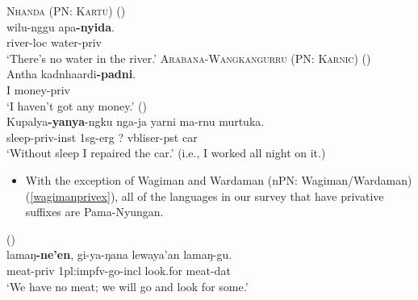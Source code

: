 \documentclass{article}
\begin{document}


\begin{exe}
  \ex \textsc{Nhanda (PN: Kartu)} (\citealt[64]{blevins01}) \label{privexist1}\\
  \gll wilu-nggu apa\textbf{-nyida}.\\
  river-{\sc loc} water-{\sc priv}\\
  \glt `There's no water in the river.'
  \ex \textsc{Arabana-Wangkangurru (PN: Karnic)} (\citealt[237]{hercus94})\\
  \gll Antha kadnhaardi\textbf{-padni}.\\
  I money-{\sc priv}\\
  \glt `I haven't got any money.'
   (\citealt[33]{westerlund07})\\
  \gll Kupalya\textbf{-yanya}-ngku nga-ja     yarni ma-rnu murtuka.\\
  sleep-{\sc priv-inst}     1{\sc sg-erg}  ?     {\sc vbliser-pst} car \\
  \glt `Without sleep I repaired the car.' (i.e., I worked all night on it.)
\end{exe}

\begin{itemize}
\item With the exception of Wagiman and Wardaman (nPN: Wagiman/Wardaman) (\ref{wagimanprivex}), all of the languages in our survey that have privative suffixes are Pama-Nyungan.
\end{itemize}

\begin{exe}
   (\citealt[133-134]{cook87}) \label{wagimanprivex}\\
  \gll lamaŋ\textbf{-ne'en}, gi-ya-ŋana lewaya'an lamaŋ-gu.\\
  meat-{\sc priv} 1{\sc pl:impfv}-go-{\sc incl} look.for meat-{\sc dat}\\
  \glt `We have no meat; we will go and look for some.'
\end{exe}
\end{document}
